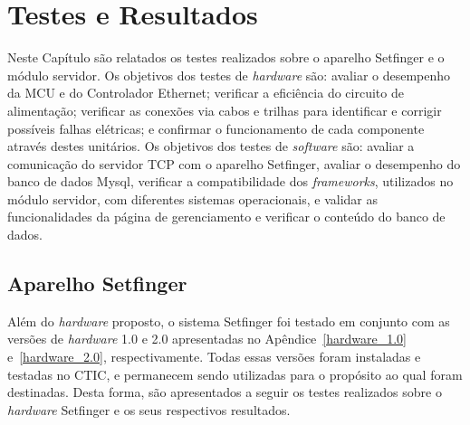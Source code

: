 \chapter{Testes e Resultados\label{cap:resultados}}
 Neste Capítulo são relatados os testes realizados sobre o aparelho Setfinger e o módulo servidor. Os objetivos dos testes de \textit{hardware} são: avaliar o desempenho da MCU e do Controlador Ethernet; verificar a eficiência do circuito de alimentação; verificar as conexões via cabos e trilhas para identificar e corrigir possíveis falhas elétricas; e confirmar o funcionamento de cada componente através destes unitários. Os objetivos dos testes de \textit{software} são: avaliar a comunicação do servidor TCP com o aparelho Setfinger, avaliar o desempenho do banco de dados Mysql, verificar a compatibilidade dos \textit{frameworks}, utilizados no módulo servidor, com diferentes sistemas operacionais, e validar as funcionalidades da página de gerenciamento e verificar o conteúdo do banco de dados.
 
 
 
\section{Aparelho Setfinger\label{testes&resultados_aparelho}}

Além do \textit{hardware} proposto, o sistema Setfinger foi testado em conjunto com as versões de \textit{hardware} 1.0 e 2.0 apresentadas no Apêndice~\ref{hardware_1.0} e~\ref{hardware_2.0}, respectivamente. Todas essas versões foram instaladas e testadas no CTIC, e permanecem sendo utilizadas para o propósito ao qual foram destinadas. Desta forma, são apresentados a seguir os testes realizados sobre o \textit{hardware} Setfinger e os seus respectivos resultados.


